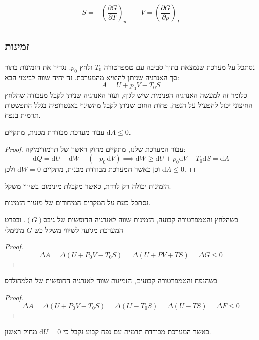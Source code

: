 \documentclass{tstextbook}
\begin{document}
\begin{corollary}
$$S=-\left(\frac{\partial G}{\partial T}\right)_{p}\qquad V=\left(\frac{\partial G}{\partial p}\right)_{T}$$

\end{corollary}
\subsection{זמינות}

\begin{definition}[זמינות]
נסתכל על מערכת שנמצאת בתוך סביבה עם טמפרטורה \(T_{0}\) ולחץ \(p_{0}\). נגדיר את הזמינות בתור סך האנרגיה שניתן להוציא מהמערכת. זה יהיה שווה לביטוי הבא:
$$A=U+p_{0}V-T_{0}S$$
כלומר זה למעשה האנרגיה הפנימית שיש לגוף, ועוד האנרגיה שניתן לקבל מעבודה שהלחץ החיצוני יכול להפעיל על הנפח, פחות החום שניתן לקבל מהשינוי באנטרופיה בגלל התפשטות תרמית בנפח.

\end{definition}
\begin{proposition}
עבור מערכת מבודדת מכנית, מתקיים \(\mathrm{d}A\leq 0\).

\end{proposition}
\begin{proof}
עבור המערכת שלנו, מתקיים מחוק ראשון של תרמודימיקה:
$${\mathrm{d}}Q=\mathrm{d}U-{\mathrm{d}}W-\left( -p_{0}\,\mathrm{d}V \right)\implies \mathrm{d}W\geq\mathrm{d}U+p_{0}\mathrm{d}V-T_{0}\mathrm{d}S=\mathrm{d}A$$
וכן כאשר המערכת מבודדת מכנית, מתקיים \(\mathrm{d}W=0\) ולכן \(\mathrm{d}A\leq 0\).

\end{proof}
\begin{corollary}
הזמינות יכולה רק לרדת, כאשר מקבלת מינימום בשיווי משקל.

\end{corollary}
נסתכל כעת על המקרים המיחודים של מזעור הזמינות.

\begin{proposition}
כשהלחץ והטמפרטורה קבועה, הזמינות שווה לאנרגיה החופשית של גיבס\((G)\). ובפרט המערכת מגיעה לשיווי משקל כש-\(G\) מינימלי

\end{proposition}
\begin{proof}
$$\Delta\!A\!=\!\Delta(U\!+\!P_{0}V\!-\!T_{0}S)\!=\!\Delta(U\!+\!P V\!+\!T S)\!=\!\Delta G\!\leq\!0$$

\end{proof}
\begin{proposition}
כשהנפח והטמפרטורה קבועים, הזמינות שווה לאנרגיה החופשית של הלמהולדס

\end{proposition}
\begin{proof}
$$\Delta A=\Delta(U+P_{0}V-T_{0}S)=\Delta(U-T_{0}S)=\Delta(U-T S)=\Delta F\leq0$$

\end{proof}
\begin{corollary}
כאשר המערכת מבודדת תרמית עם נפח קבוע נקבל כי \(\mathrm{d}U=0\) מחוק ראשון.

\end{corollary}
\end{document}
